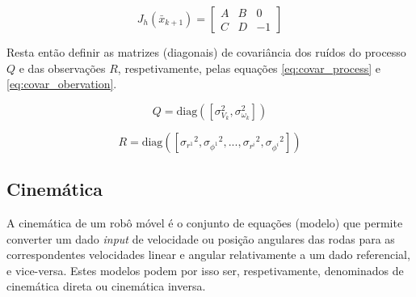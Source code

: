 \documentclass[twocolumn]{article}
\begin{document}
\begin{equation}
    J_h(\bar{x}_{k+1}) =
    \begin{bmatrix}
    A & B & 0 \\
    C & D & -1
    \end{bmatrix}
    \label{eq:sensor_model_jacobian}
\end{equation}

Resta então definir as matrizes (diagonais) de covariância dos ruídos do processo $Q$ e das observações $R$, respetivamente, pelas equações \ref{eq:covar_process} e \ref{eq:covar_obervation}. 

\begin{equation}
    Q = \text{diag}([\sigma_{V_k}^2, \sigma_{\omega_k}^2])
    \label{eq:covar_process}
\end{equation}

\begin{equation}
    R = \text{diag}([{\sigma_{r^1}}^2, {\sigma_{\phi^1}}^2, ..., {\sigma_{r^i}}^2, {\sigma_{\phi^i}}^2])
    \label{eq:covar_obervation}
\end{equation}

\subsection{Cinemática}

A cinemática de um robô móvel é o conjunto de equações (modelo) que permite converter um dado \textit{input} de velocidade ou posição angulares das rodas para as correspondentes velocidades linear e angular relativamente a um dado referencial, e vice-versa. Estes modelos podem por isso ser, respetivamente, denominados de cinemática direta ou cinemática inversa. 
\end{document}
